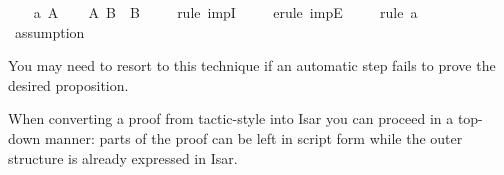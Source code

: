 \begin{isabellebody}
\ \ \isamarkupfalse%
\ a{\isacharcolon}\ {\isachardoublequote}A{\isachardoublequote}\isanewline
\ \ \isamarkupfalse%
\ {\isachardoublequote}{\isacharparenleft}A\ {\isasymlongrightarrow}B{\isacharparenright}\ {\isasymlongrightarrow}\ B{\isachardoublequote}\isanewline
\ \ \ \ \isamarkupfalse%
rule\ impI{\isacharparenright}\isanewline
\ \ \ \ \isamarkupfalse%
erule\ impE{\isacharparenright}\isanewline
\ \ \ \ \isamarkupfalse%
rule\ a{\isacharparenright}\isanewline
\ \ \ \ \isamarkupfalse%
\ assumption\isanewline
\ \ \ \ \isamarkupfalse%
\isanewline
\isamarkupfalse%
\isamarkupfalse%
%
\begin{isamarkuptext}%
\noindent You may need to resort to this technique if an
automatic step fails to prove the desired proposition.

When converting a proof from tactic-style into Isar you can proceed
in a top-down manner: parts of the proof can be left in script form
while the outer structure is already expressed in Isar.%
\end{isamarkuptext}%
\isamarkuptrue%
\isamarkupfalse%
\end{isabellebody}%
